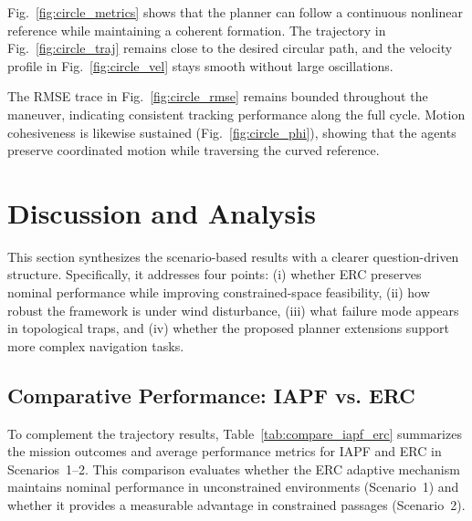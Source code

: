 \documentclass[pdflatex,sn-basic]{sn-jnl}%
\begin{document}
        Fig.~\ref{fig:circle_metrics} shows that the planner can follow a continuous nonlinear reference while maintaining a coherent formation. The trajectory in Fig.~\ref{fig:circle_traj} remains close to the desired circular path, and the velocity profile in Fig.~\ref{fig:circle_vel} stays smooth without large oscillations.

        The RMSE trace in Fig.~\ref{fig:circle_rmse} remains bounded throughout the maneuver, indicating consistent tracking performance along the full cycle. Motion cohesiveness is likewise sustained (Fig.~\ref{fig:circle_phi}), showing that the agents preserve coordinated motion while traversing the curved reference.

\section{Discussion and Analysis}
    This section synthesizes the scenario-based results with a clearer question-driven structure. Specifically, it addresses four points: (i) whether ERC preserves nominal performance while improving constrained-space feasibility, (ii) how robust the framework is under wind disturbance, (iii) what failure mode appears in topological traps, and (iv) whether the proposed planner extensions support more complex navigation tasks.

    \subsection{Comparative Performance: IAPF vs. ERC} \label{sec:analysis_comparison}

        To complement the trajectory results, Table~\ref{tab:compare_iapf_erc} summarizes the mission outcomes and average performance metrics for IAPF and ERC in Scenarios~1--2. This comparison evaluates whether the ERC adaptive mechanism maintains nominal performance in unconstrained environments (Scenario~1) and whether it provides a measurable advantage in constrained passages (Scenario~2).
\end{document}
